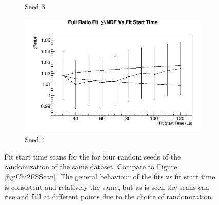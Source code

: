 \begin{figure}[]
\begin{subfigure}[t]{0.45\textwidth}
			    \caption{Seed 3}
		    \end{subfigure}
		    \begin{subfigure}[t]{0.45\textwidth}
			    \centering
				\includegraphics[width=\textwidth]{RatioCBO_Chi2NDF_Vs_FS_canv-Seed3}
			    \caption{Seed 4}
		    \end{subfigure}%
		\caption[RandomSeedFitStartScansChi2]{Fit start time scans for the \chisq for four random seeds of the randomization of the same dataset. Compare to Figure \ref{fig:Chi2FSScan}. The general behaviour of the fits vs fit start time is consistent and relatively the same, but as is seen the scans can rise and fall at different points due to the choice of randomization.}
		\label{fig:RandomSeedFitStartScansChi2}
		\end{figure}

